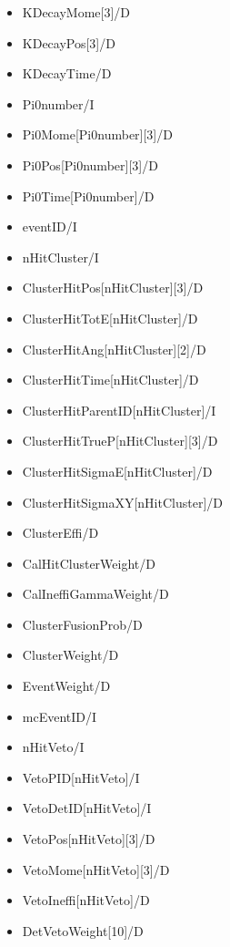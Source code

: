 \documentclass[a4paper,12pt]{article}
\begin{document}
  \begin{itemize}
   \item KDecayMome[3]/D
   \item KDecayPos[3]/D
   \item KDecayTime/D
   \item Pi0number/I
   \item Pi0Mome[Pi0number][3]/D
   \item Pi0Pos[Pi0number][3]/D
   \item Pi0Time[Pi0number]/D
   \item eventID/I
   \item nHitCluster/I
   \item ClusterHitPos[nHitCluster][3]/D
   \item ClusterHitTotE[nHitCluster]/D
   \item ClusterHitAng[nHitCluster][2]/D
   \item ClusterHitTime[nHitCluster]/D
   \item ClusterHitParentID[nHitCluster]/I
   \item ClusterHitTrueP[nHitCluster][3]/D
   \item ClusterHitSigmaE[nHitCluster]/D
   \item ClusterHitSigmaXY[nHitCluster]/D
   \item ClusterEffi/D
   \item CalHitClusterWeight/D
   \item CalIneffiGammaWeight/D
   \item ClusterFusionProb/D
   \item ClusterWeight/D
   \item EventWeight/D
   \item mcEventID/I
   \item nHitVeto/I
   \item VetoPID[nHitVeto]/I
   \item VetoDetID[nHitVeto]/I
   \item VetoPos[nHitVeto][3]/D
   \item VetoMome[nHitVeto][3]/D
   \item VetoIneffi[nHitVeto]/D
   \item DetVetoWeight[10]/D
  \end{itemize}
\end{document}
